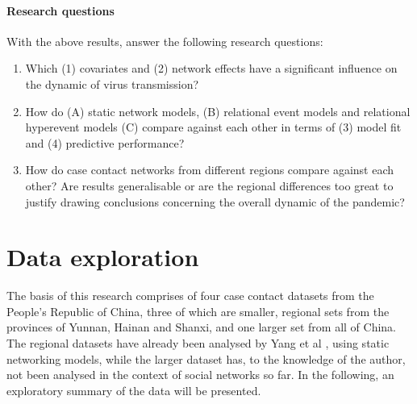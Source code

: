 \documentclass{article}
\begin{document}
	\paragraph{Research questions} With the above results, answer the following research questions:
	\begin{enumerate}
		\item Which (1) covariates and (2) network effects have a significant influence on the dynamic of virus transmission?
		\item How do (A) static network models, (B) relational event models and relational hyperevent models (C) compare against each other in terms of (3) model fit and (4) predictive performance?
		\item How do case contact networks from different regions compare against each other? Are results generalisable or are the regional differences too great to justify drawing conclusions concerning the overall dynamic of the pandemic?
	\end{enumerate}
	
	\section{Data exploration}
	\label{sec:Data_exploration}
	The basis of this research comprises of four case contact datasets from the People's Republic of China, three of which are smaller, regional sets from the provinces of Yunnan, Hainan and Shanxi, and one larger set from all of China. The regional datasets have already been analysed by Yang et al \cite{hainan_publication},\cite{shanxi_publication} using static networking models, while the larger dataset has, to the knowledge of the author, not been analysed in the context of social networks so far. In the following, an exploratory summary of the data will be presented.
	
\end{document}
